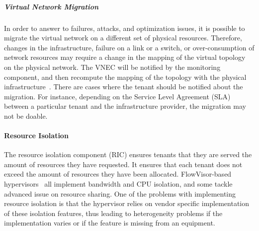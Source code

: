 

\subparagraph{Virtual Network Migration}
In order to answer to failures, attacks, and optimization issues, it is possible to migrate the virtual network on a different set of physical resources. 
Therefore, changes in the infrastructure, failure on a link or a switch, or over-consumption of network resources may require a change in the mapping of the virtual topology on the physical network.
The VNEC will be notified by the monitoring component, and then recompute the mapping of the topology with the physical infrastructure~\cite{VeRTIGO-Corin2012a,AutoSlice-Bozakov2012,CoVisor-Jin2015}.
There are cases where the tenant should be notified about the migration.
For instance, depending on the Service Level Agreement (SLA) between a particular tenant and the infrastructure provider, the migration may not be doable.

\paragraph{Resource Isolation}
The resource isolation component (RIC) ensures tenants that they are served the amount of resources they have requested.
It ensures that each tenant does not exceed the amount of resources they have been allocated.
FlowVisor-based hypervisors~\cite{FlowVisor-Sherwood2009,ADVisor-Salvadori2012,VeRTIGO-Corin2012a,EnhancedFV-Min2012,SlicesIsolator-El-Azzab2011,DoubleFV-Yin2013} all implement bandwidth and CPU isolation, and some tackle advanced issue on resource sharing. One of the problems with implementing resource isolation is that the hypervisor relies on vendor specific implementation of these isolation features, thus leading to heterogeneity problems if the implementation varies or if the feature is missing from an equipment.


